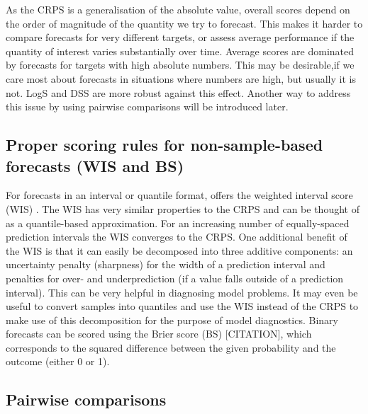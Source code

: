 \documentclass[article,shortnames]{jss}
\begin{document}
As the CRPS is a generalisation of the absolute value, overall scores depend on the order of magnitude of the quantity we try to forecast. This makes it harder to compare forecasts for very different targets, or assess average performance if the quantity of interest varies substantially over time. Average scores are dominated by forecasts for targets with high absolute numbers. This may be desirable,if we care most about forecasts in situations where numbers are high, but usually it is not. LogS and DSS are more robust against this effect. Another way to address this issue by using pairwise comparisons will be introduced later. 

\subsection{Proper scoring rules for non-sample-based forecasts (WIS and BS)}
For forecasts in an interval or quantile format,  offers the weighted interval score (WIS) \citep{bracherEvaluatingEpidemicForecasts2021}. 
The WIS has very similar properties to the CRPS and can be thought of as a quantile-based approximation. For an increasing number of equally-spaced prediction intervals the WIS converges to the CRPS. One additional benefit of the WIS is that it can easily be decomposed into three additive components: an uncertainty penalty (sharpness) for the width of a prediction interval and penalties for over- and underprediction (if a value falls outside of a prediction interval). This can be very helpful in diagnosing model problems. It may even be useful to convert samples into quantiles and use the WIS instead of the CRPS to make use of this decomposition for the purpose of model diagnostics. 
Binary forecasts can be scored using the Brier score (BS) [CITATION], which corresponds to the squared difference between the given probability and the outcome (either 0 or 1). 

\subsection{Pairwise comparisons} 
\end{document}
